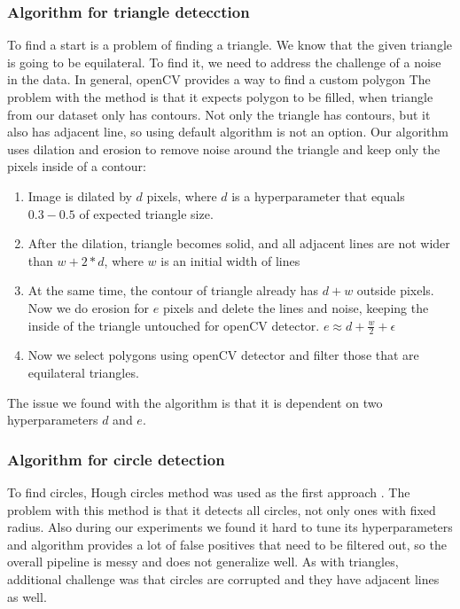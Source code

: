 \documentclass[a4paper,12pt]{extarticle}
\begin{document}
\subsubsection{Algorithm for triangle detecction}

To find a start is a problem of finding a triangle.
We know that the given triangle is going to be equilateral.
To find it, we need to address the challenge of a noise in the data.
In general, openCV provides a way to find a custom polygon \cite{findcontours}
The problem with the method is that it expects polygon to be filled, when triangle from our dataset only has contours.
Not only the triangle has contours, but it also has adjacent line, so using default algorithm is not an option.
Our algorithm uses dilation and erosion to remove noise around the triangle and keep only the pixels inside of a contour:
\begin{enumerate}
    \item Image is dilated by $d$ pixels, where $d$ is a hyperparameter that equals $0.3-0.5$ of expected triangle size.
    \item After the dilation, triangle becomes solid, and all adjacent lines are not wider than $w + 2 * d$, where $w$ is an initial width of lines
    \item At the same time, the contour of triangle already has $d + w$ outside pixels. Now we do erosion for $e$ pixels and delete the lines and noise, keeping the inside of the triangle untouched for openCV detector. $e \approx d + \frac{w}{2} + \epsilon$
    \item Now we select polygons using openCV detector and filter those that are equilateral triangles.
\end{enumerate}

The issue we found with the algorithm is that it is dependent on two hyperparameters $d$ and $e$.

\subsubsection{Algorithm for circle detection}

To find circles, Hough circles method was used as the first approach \cite{houghcircles}.
The problem with this method is that it detects all circles, not only ones with fixed radius.
Also during our experiments we found it hard to tune its hyperparameters and algorithm provides a lot of false positives that need to be filtered out, so the overall pipeline is messy and does not generalize well.
As with triangles, additional challenge was that circles are corrupted and they have adjacent lines as well.
\end{document}
